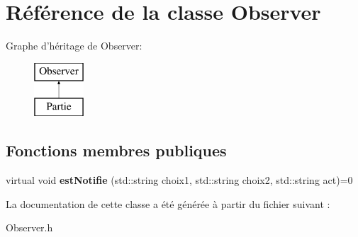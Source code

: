 \hypertarget{classObserver}{\section{\-Référence de la classe \-Observer}
\label{classObserver}
}
\-Graphe d'héritage de \-Observer\-:\begin{figure}[H]
\begin{center}
\leavevmode
\includegraphics[height=2.000000cm]{classObserver}
\end{center}
\end{figure}
\subsection*{\-Fonctions membres publiques}
\begin{DoxyCompactItemize}
\item 
\hypertarget{classObserver_ada9b4853829cf3806379037cf4e6fcc6}{virtual void {\bfseries est\-Notifie} (std\-::string choix1, std\-::string choix2, std\-::string act)=0}\label{classObserver_ada9b4853829cf3806379037cf4e6fcc6}

\end{DoxyCompactItemize}


\-La documentation de cette classe a été générée à partir du fichier suivant \-:\begin{DoxyCompactItemize}
\item 
\-Observer.\-h\end{DoxyCompactItemize}
